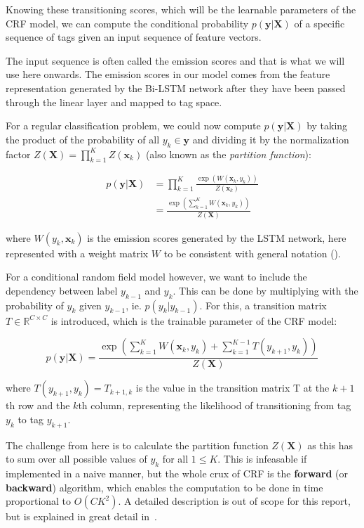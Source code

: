 Knowing these transitioning scores, which will be the learnable parameters of
the CRF model, we can compute the conditional probability $p(\bm{y}|\bm{X})$ of
a specific sequence of tags given an input sequence of feature vectors.

The input sequence is often called the emission scores and that is what we will
use here onwards. The emission scores in our model comes from the feature
representation generated by the Bi-LSTM network after they have been passed
through the linear layer and mapped to tag space. 

For a regular classification problem, we could now compute $p(\bm{y}|\bm{X})$ by
taking the product of the probability of all $y_{k} \in \bm{y}$ and dividing it
by the normalization factor $Z(\bm{X}) = \prod_{k=1}^{K} Z(\bm{x}_{k})$ (also
known as the \textit{partition function}):

\begin{align*}
p(\bm{y}|\bm{X}) & = \prod_{k=1}^{K} \frac{\exp( W(\bm{x}_{k}, y_{k}) )} 
                                            {Z(\bm{x}_{k})} \\
                 & = \frac{\exp( \sum_{k=1}^{K} W(\bm{x}_k, y_{k}) )}
                                            {Z(\bm{X})}
\end{align*}

where $W(y_{k}, \bm{x}_{k})$ is the emission scores generated by the LSTM
network, here represented with a weight matrix $W$ to be consistent with general
notation (\cite{treviso2019crf}).

For a conditional random field model however, we want to include the
dependency between label $y_{k-1}$ and $y_{k}$. This can be done by multiplying
with the probability of $y_{k}$ given $y_{k-1}$, ie. $p(y_{k}|y_{k-1})$. For
this, a transition matrix $T \in \mathbb{R}^{C \times C}$ is introduced, which 
is the trainable parameter of the CRF model:

\begin{equation*}
p(\bm{y}|\bm{X}) = \frac{\exp( \sum_{k=1}^{K} W(\bm{x}_k, y_{k}) +
                    \sum_{k=1}^{K-1} T(y_{k+1}, y_{k}) )}{Z(\bm{X})}
\end{equation*}

where $T(y_{k+1}, y_{k}) = T_{k+1,k}$ is the value in the transition matrix T at
the $k+1$th row and the $k$th column, representing the likelihood of
transitioning from tag $y_{k}$ to tag $y_{k+1}$.

The challenge from here is to calculate the partition function $Z(\bm{X})$ as
this has to sum over all possible values of $y_{k}$ for all $1 \leq K$. This is
infeasable if implemented in a naive manner, but the whole crux of CRF is the
\textbf{forward} (or \textbf{backward}) algorithm, which enables the computation
to be done in time proportional to $O(CK^{2})$. A detailed description is out of
scope for this report, but is explained in great detail
in~\cite{sutton2012introduction}.

